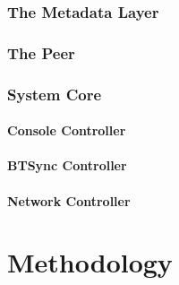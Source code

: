 \documentclass[12pt]{report}
\begin{document}
\subsection{The Metadata Layer}



\subsection{The Peer}


\subsection{System Core}


\subsubsection{Console Controller}


\subsubsection{BTSync Controller}


\subsubsection{Network Controller}


\chapter{Methodology}

\end{document}
